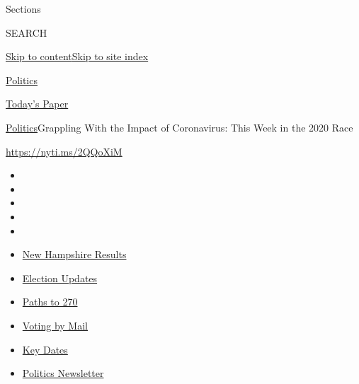 Sections

SEARCH

\protect\hyperlink{site-content}{Skip to
content}\protect\hyperlink{site-index}{Skip to site index}

\href{https://www.nytimes3xbfgragh.onion/section/politics}{Politics}

\href{https://myaccount.nytimes3xbfgragh.onion/auth/login?response_type=cookie\&client_id=vi}{}

\href{https://www.nytimes3xbfgragh.onion/section/todayspaper}{Today's
Paper}

\href{/section/politics}{Politics}\textbar{}Grappling With the Impact of
Coronavirus: This Week in the 2020 Race

\url{https://nyti.ms/2QQoXiM}

\begin{itemize}
\item
\item
\item
\item
\item
\end{itemize}

\begin{itemize}
\item
  \href{https://www.nytimes3xbfgragh.onion/interactive/2020/09/08/us/elections/results-new-hampshire-primary-elections.html?action=click\&pgtype=Article\&state=default\&region=TOP_BANNER\&context=storylines_menu}{New
  Hampshire Results}
\item
  \href{https://www.nytimes3xbfgragh.onion/live/2020/09/08/us/trump-vs-biden?action=click\&pgtype=Article\&state=default\&region=TOP_BANNER\&context=storylines_menu}{Election
  Updates}
\item
  \href{https://www.nytimes3xbfgragh.onion/interactive/2020/us/elections/election-states-biden-trump.html?action=click\&pgtype=Article\&state=default\&region=TOP_BANNER\&context=storylines_menu}{Paths
  to 270}
\item
  \href{https://www.nytimes3xbfgragh.onion/interactive/2020/08/31/us/politics/vote-by-mail-deadlines.html?action=click\&pgtype=Article\&state=default\&region=TOP_BANNER\&context=storylines_menu}{Voting
  by Mail}
\item
  \href{https://www.nytimes3xbfgragh.onion/interactive/2019/us/elections/2020-presidential-election-calendar.html?action=click\&pgtype=Article\&state=default\&region=TOP_BANNER\&context=storylines_menu}{Key
  Dates}
\item
  \href{https://www.nytimes3xbfgragh.onion/newsletters/politics?action=click\&pgtype=Article\&state=default\&region=TOP_BANNER\&context=storylines_menu}{Politics
  Newsletter}
\end{itemize}

